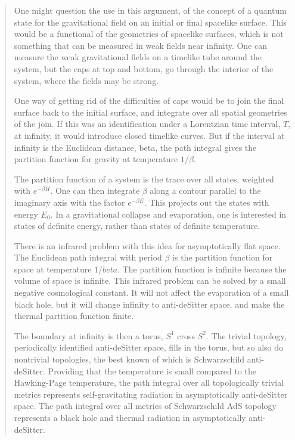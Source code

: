 \documentclass{article}
\begin{document}
\begin{quote}
One might question the use in this argument, of the concept of a quantum
state for the gravitational field on an initial or final spacelike
surface. This would be a functional of the geometries of spacelike
surfaces, which is not something that can be measured in weak fields
near infinity. One can measure the weak gravitational fields on a
timelike tube around the system, but the caps at top and bottom, go
through the interior of the system, where the fields may be strong.

One way of getting rid of the difficulties of caps would be to join the
final surface back to the initial surface, and integrate over all
spatial geometries of the join. If this was an identification under a
Lorentzian time interval, \(T\), at infinity, it would introduce closed
timelike curves. But if the interval at infinity is the Euclidean
distance, beta, the path integral gives the partition function for
gravity at temperature \(1/\beta\).

The partition function of a system is the trace over all states,
weighted with \(e^{-\beta H}\). One can then integrate $\beta$ along a
contour parallel to the imaginary axis with the factor \(e^{-\beta E}\).
This projects out the states with energy \(E_0\). In a gravitational
collapse and evaporation, one is interested in states of definite
energy, rather than states of definite temperature.

There is an infrared problem with this idea for asymptotically flat
space. The Euclidean path integral with period \(\beta\) is the
partition function for space at temperature \(1/beta\). The partition
function is infinite because the volume of space is infinite. This
infrared problem can be solved by a small negative cosmological
constant. It will not affect the evaporation of a small black hole, but
it will change infinity to anti-deSitter space, and make the thermal
partition function finite.

The boundary at infinity is then a torus, \(S^1\) cross \(S^2\). The
trivial topology, periodically identified anti-deSitter space, fills in
the torus, but so also do nontrivial topologies, the best known of which
is Schwarzschild anti-deSitter. Providing that the temperature is small
compared to the Hawking-Page temperature, the path integral over all
topologically trivial metrics represents self-gravitating radiation in
asymptotically anti-deSitter space. The path integral over all metrics
of Schwarzschild AdS topology represents a black hole and thermal
radiation in asymptotically anti-deSitter.


\end{quote}
\end{document}
